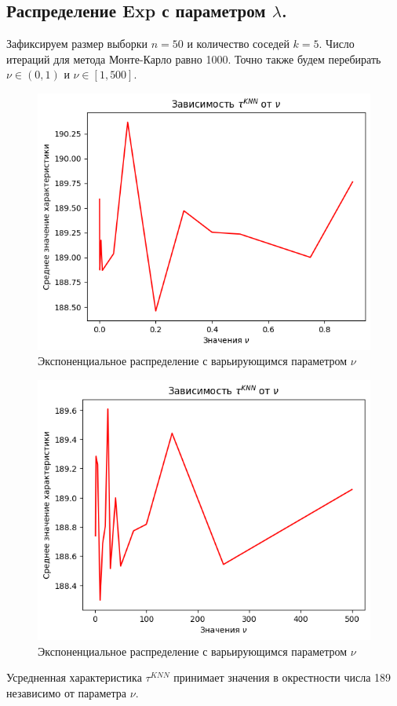 \documentclass{report}
\begin{document}
\subsection{Распределение Exp с параметром $\lambda$.}
Зафиксируем размер выборки $n = 50$ и количество соседей $k = 5$. Число итераций для метода Монте-Карло равно 1000.
\newline
\newline
Точно также будем перебирать $\nu \in (0, 1)$ и $\nu \in [1, 500]$.
\begin{figure}[h]
    \centering
    \includegraphics[width=0.5\linewidth]{3.png}
    \caption{Экспоненциальное распределение с варьирующимся параметром $\nu$}
\end{figure}
\begin{figure}[h]
    \centering
    \includegraphics[width=0.5\linewidth]{4.png}
    \caption{Экспоненциальное распределение с варьирующимся параметром $\nu$}
\end{figure}
\newline
\newline
Усредненная характеристика $\tau^{KNN}$ принимает значения в окрестности числа 189 независимо от параметра $\nu$.
\end{document}

